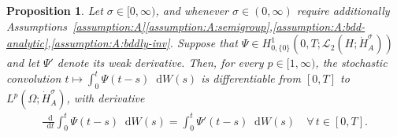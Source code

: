 \documentclass[reqno]{amsart}
\numberwithin{equation}{section}
\newcommand{\rd}{\mathop{}\!\mathrm{d}}
\newcommand{\Hdot}[1]{\dot{H}^{#1}_A}
\newtheorem{proposition}[lemma]{Proposition}
\theoremstyle{remark}
\theoremstyle{definition}
\begin{document}
\begin{proposition}\label{prop:stoch-conv-Psi-diffb-under-int}
	Let $\sigma\in[0,\infty)$, and 
	whenever ${\sigma\in(0,\infty)}$ 
	require additionally 
	Assumptions~\textup{\ref{assumption:A}\ref{assumption:A:semigroup},\ref{assumption:A:bdd-analytic},\ref{assumption:A:bddly-inv}}. 
	Suppose that 
	$\Psi \in H^1_{0,\{0\}}(0, T; \mathscr L_2(H; \Hdot{\sigma}))$ 
	and let $\Psi'$ denote its weak derivative.
	Then, for every $p \in [1,\infty)$, the stochastic convolution  
	$t \mapsto \int_0^t \Psi(t-s)\rd W(s)$ is differentiable 
	from $[0,T]$ to $L^p(\Omega; \Hdot \sigma)$, with derivative 
	\begin{align}
	\frac{\rd}{\rd t}\int_0^{t} \Psi(t-s)\rd W(s) 
	= 
	\int_0^t \Psi'(t-s) \rd W(s) 
	\quad 
	\forall \,
	t \in [0,T].
	\label{eq:stoch-conv-Psi-diffb-under-int-sign}
	\end{align}
\end{proposition}
\end{document}
